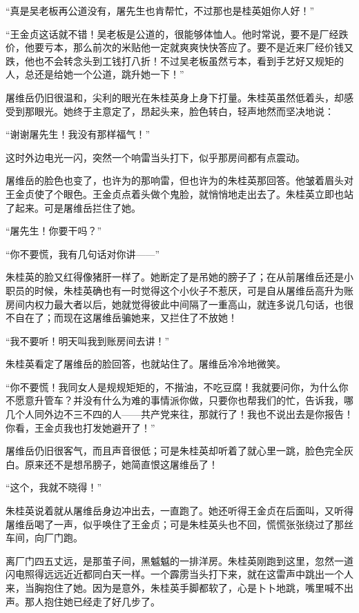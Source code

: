 \par “真是吴老板再公道没有，屠先生也肯帮忙，不过那也是桂英姐你人好！”
\par “王金贞这话就不错！吴老板是公道的，很能够体恤人。他时常说，要不是厂经跌价，他要亏本，那么前次的米贴他一定就爽爽快快答应了。要不是近来厂经价钱又跌，他也不会转念头到工钱打八折！不过吴老板虽然亏本，看到手艺好又规矩的人，总还是给她一个公道，跳升她一下！”
\par 屠维岳仍旧很温和，尖利的眼光在朱桂英身上身下打量。朱桂英虽然低着头，却感受到那眼光。她终于主意定了，昂起头来，脸色转白，轻声地然而坚决地说：
\par “谢谢屠先生！我没有那样福气！”
\par 这时外边电光一闪，突然一个响雷当头打下，似乎那房间都有点震动。
\par 屠维岳的脸色也变了，也许为的那响雷，但也许为的朱桂英那回答。他皱着眉头对王金贞使了个眼色。王金贞点着头做个鬼脸，就悄悄地走出去了。朱桂英立即也站了起来。可是屠维岳拦住了她。
\par “屠先生！你要干吗？”
\par “你不要慌，我有几句话对你讲——”
\par 朱桂英的脸又红得像猪肝一样了。她断定了是吊她的膀子了；在从前屠维岳还是小职员的时候，朱桂英确也有一时觉得这个小伙子不惹厌，可是自从屠维岳高升为账房间内权力最大者以后，她就觉得彼此中间隔了一重高山，就连多说几句话，也很不自在了；而现在这屠维岳骗她来，又拦住了不放她！
\par “我不要听！明天叫我到账房间去讲！”
\par 朱桂英看定了屠维岳的脸回答，也就站住了。屠维岳冷冷地微笑。
\par “你不要慌！我同女人是规规矩矩的，不揩油，不吃豆腐！我就要问你，为什么你不愿意升管车？并没有什么为难的事情派你做，只要你也帮我们的忙，告诉我，哪几个人同外边不三不四的人——共产党来往，那就行了！我也不说出去是你报告！你看，王金贞我也打发她避开了！”
\par 屠维岳仍旧很客气，而且声音很低；可是朱桂英却听着了就心里一跳，脸色完全灰白。原来还不是想吊膀子，她简直恨这屠维岳了！
\par “这个，我就不晓得！”
\par 朱桂英说着就从屠维岳身边冲出去，一直跑了。她还听得王金贞在后面叫，又听得屠维岳喝了一声，似乎唤住了王金贞；可是朱桂英头也不回，慌慌张张绕过了那丝车间，向厂门跑。
\par 离厂门四五丈远，是那茧子间，黑魆魆的一排洋房。朱桂英刚跑到这里，忽然一道闪电照得远远近近都同白天一样。一个霹雳当头打下来，就在这雷声中跳出一个人来，当胸抱住了她。因为是意外，朱桂英手脚都软了，心是卜卜地跳，嘴里喊不出声。那人抱住她已经走了好几步了。
